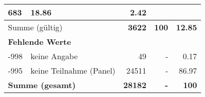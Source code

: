 \begin{longtable}{lXrrr}
       \num{683} &
       \num[round-mode=places,round-precision=2]{18,86} &
         \num[round-mode=places,round-precision=2]{2,42} \\
     \midrule
     \multicolumn{2}{l}{Summe (gültig)} &
       \textbf{\num{3622}} &
     \textbf{100} &
       \textbf{\num[round-mode=places,round-precision=2]{12,85}} \\
     \multicolumn{5}{l}{\textbf{Fehlende Werte}}\\
       -998 &
       keine Angabe &
         \num{49} &
        - &
         \num[round-mode=places,round-precision=2]{0,17} \\
       -995 &
       keine Teilnahme (Panel) &
         \num{24511} &
        - &
         \num[round-mode=places,round-precision=2]{86,97} \\
     \midrule
     \multicolumn{2}{l}{\textbf{Summe (gesamt)}} &
          \textbf{\num{28182}} &
        \textbf{-} &
        \textbf{100} \\
     \bottomrule
     \end{longtable}
     
